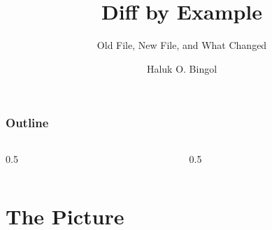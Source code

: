 \documentclass[aspectratio=169,10pt,compress]{beamer}
\title{Diff by Example}
\subtitle{Old File, New File, and What Changed}
\author[Bingol]{Haluk O. Bingol}
\institute[FCIS]{
    Faculty of Computer and Information Sciences\\
    Yeditepe University
}
\date{}
\begin{document}
\begin{frame}[t,fragile]
  \titlepage
\end{frame}

\begin{frame}[t,fragile] \frametitle{Outline}
  \begin{columns}[T]
    \begin{column}{0.5\textwidth}
      \tableofcontents[sections={1-4}]
    \end{column}
    \begin{column}{0.5\textwidth}
      \tableofcontents[sections={5-7}]
    \end{column}
  \end{columns}
\end{frame}

\section[Idea]{The Picture}
\end{document}
